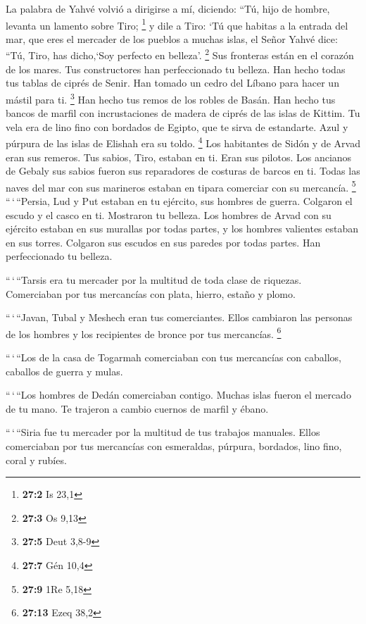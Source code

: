 \begin{paracol}{2}
 La palabra de Yahvé volvió a dirigirse a mí, diciendo:
 ``Tú, hijo de hombre, levanta un lamento sobre Tiro;
\footnote{\textbf{27:2} Is 23,1}  y dile a Tiro: `Tú que
habitas a la entrada del mar, que eres el mercader de los pueblos a
muchas islas, el Señor Yahvé dice: ``Tú, Tiro, has dicho,`Soy perfecto
en belleza'. \footnote{\textbf{27:3} Os 9,13}  Sus
fronteras están en el corazón de los mares. Tus constructores han
perfeccionado tu belleza.  Han hecho todas tus tablas de
ciprés de Senir. Han tomado un cedro del Líbano para hacer un mástil
para ti. \footnote{\textbf{27:5} Deut 3,8-9}  Han hecho
tus remos de los robles de Basán. Han hecho tus bancos de marfil con
incrustaciones de madera de ciprés de las islas de Kittim.
 Tu vela era de lino fino con bordados de Egipto, que te
sirva de estandarte. Azul y púrpura de las islas de Elishah era su
toldo. \footnote{\textbf{27:7} Gén 10,4}  Los habitantes
de Sidón y de Arvad eran sus remeros. Tus sabios, Tiro, estaban en ti.
Eran sus pilotos.  Los ancianos de Gebaly sus sabios
fueron sus reparadores de costuras de barcos en ti. Todas las naves del
mar con sus marineros estaban en tipara comerciar con su mercancía.
\footnote{\textbf{27:9} 1Re 5,18}  ``\,`\,``Persia, Lud y
Put estaban en tu ejército, sus hombres de guerra. Colgaron el escudo y
el casco en ti. Mostraron tu belleza.  Los hombres de
Arvad con su ejército estaban en sus murallas por todas partes, y los
hombres valientes estaban en sus torres. Colgaron sus escudos en sus
paredes por todas partes. Han perfeccionado tu belleza.

 ``\,`\,``Tarsis era tu mercader por la multitud de toda
clase de riquezas. Comerciaban por tus mercancías con plata, hierro,
estaño y plomo.

 ``\,`\,``Javan, Tubal y Meshech eran tus comerciantes.
Ellos cambiaron las personas de los hombres y los recipientes de bronce
por tus mercancías. \footnote{\textbf{27:13} Ezeq 38,2}

 ``\,`\,``Los de la casa de Togarmah comerciaban con tus
mercancías con caballos, caballos de guerra y mulas.

 ``\,`\,``Los hombres de Dedán comerciaban contigo.
Muchas islas fueron el mercado de tu mano. Te trajeron a cambio cuernos
de marfil y ébano.

 ``\,`\,``Siria fue tu mercader por la multitud de tus
trabajos manuales. Ellos comerciaban por tus mercancías con esmeraldas,
púrpura, bordados, lino fino, coral y rubíes.


\end{paracol}
